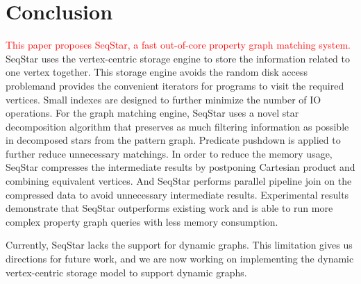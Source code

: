 \section{Conclusion}\label{sec:conclusion}
\textcolor{red}{This paper proposes SeqStar, a fast out-of-core property graph matching system.}
SeqStar uses the vertex-centric storage engine to store the information related to one vertex together.
This storage engine avoids the random disk access problemand provides the convenient iterators for programs to visit the required vertices.
Small indexes are designed to further minimize the number of IO operations.
For the graph matching engine,
SeqStar uses a novel star decomposition algorithm that preserves as much filtering information as possible in decomposed stars from the pattern graph.
Predicate pushdown is applied to further reduce unnecessary matchings.
In order to reduce the memory usage, SeqStar compresses the intermediate results by postponing Cartesian product and combining equivalent vertices.
And SeqStar performs parallel pipeline join on the compressed data to avoid unnecessary intermediate results.
Experimental results demonstrate that SeqStar outperforms existing work and is able to run more complex property graph queries with less memory consumption.


Currently, SeqStar lacks the support for dynamic graphs.
This limitation gives us directions for future work,
and we are now working on implementing the dynamic vertex-centric storage model to support dynamic graphs.
